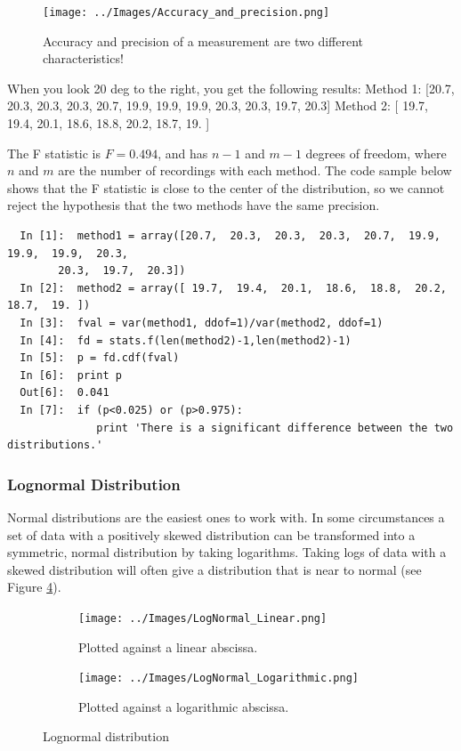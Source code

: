 \begin{figure}
  \centering
  \texttt{[image: ../Images/Accuracy\_and\_precision.png]}\\
  \caption{Accuracy and precision of a measurement are two different characteristics!}
  \label{fig:accuracy}
\end{figure}

When you look 20 deg to the right, you get the following results:
Method 1: [20.7,  20.3,  20.3,  20.3,  20.7,  19.9,  19.9,  19.9,  20.3,
        20.3,  19.7,  20.3]
Method 2: [ 19.7,  19.4,  20.1,  18.6,  18.8,  20.2,  18.7,  19. ]

The F statistic is $F = 0.494$, and has $n-1$ and $m-1$ degrees of freedom, where $n$ and $m$ are the number of recordings with each method. The code sample below shows that the F statistic is close to the center of the distribution, so we cannot reject the hypothesis that the two methods have the same precision.

\begin{lstlisting}
  In [1]:  method1 = array([20.7,  20.3,  20.3,  20.3,  20.7,  19.9,  19.9,  19.9,  20.3,
        20.3,  19.7,  20.3])
  In [2]:  method2 = array([ 19.7,  19.4,  20.1,  18.6,  18.8,  20.2,  18.7,  19. ])
  In [3]:  fval = var(method1, ddof=1)/var(method2, ddof=1)
  In [4]:  fd = stats.f(len(method2)-1,len(method2)-1)
  In [5]:  p = fd.cdf(fval)
  In [6]:  print p
  Out[6]:  0.041
  In [7]:  if (p<0.025) or (p>0.975):
              print 'There is a significant difference between the two distributions.'
\end{lstlisting}


\subsubsection{Lognormal Distribution}

Normal distributions are the easiest ones to work with. In some circumstances a set of data with a positively skewed distribution can be transformed into a symmetric, normal distribution by taking logarithms. Taking logs of data with a skewed distribution will often give a distribution that is near to normal (see Figure \ref{fig:lognormal}).

\begin{figure}
\centering
\begin{subfigure}{.5\textwidth}
  \centering
  \texttt{[image: ../Images/LogNormal\_Linear.png]}
  \caption{Plotted against a linear abscissa.}
  \label{fig:Lognormal_Sub1}
\end{subfigure}%
\begin{subfigure}{.5\textwidth}
  \centering
  \texttt{[image: ../Images/LogNormal\_Logarithmic.png]}
  \caption{Plotted against a logarithmic abscissa.}
  \label{fig:Lognormal_Sub2}
\end{subfigure}
\caption{Lognormal distribution}
\label{fig:lognormal}
\end{figure}

